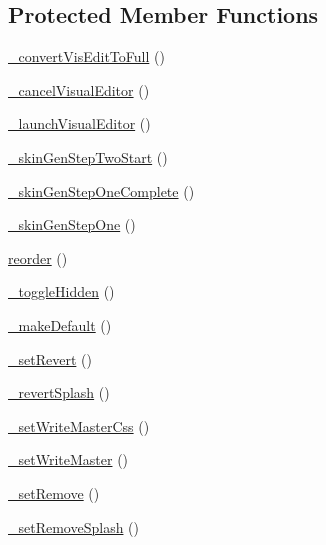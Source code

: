 \subsection*{Protected Member Functions}
\begin{DoxyCompactItemize}
\item 
\hyperlink{classadmin__core__templates__skinsets_afd543a03bf3640aceb2c6581c6a253f4}{\-\_\-convert\-Vis\-Edit\-To\-Full} ()
\item 
\hyperlink{classadmin__core__templates__skinsets_a1fa45ba529feda1ed53e0b3da62ac052}{\-\_\-cancel\-Visual\-Editor} ()
\item 
\hyperlink{classadmin__core__templates__skinsets_a497dec6546df26617a141862ba5a47e8}{\-\_\-launch\-Visual\-Editor} ()
\item 
\hyperlink{classadmin__core__templates__skinsets_a8c2fc2e9df2a3e2ce5bb08481a7ed32d}{\-\_\-skin\-Gen\-Step\-Two\-Start} ()
\item 
\hyperlink{classadmin__core__templates__skinsets_a709366271389c5a9874f5f8fa1bc62f8}{\-\_\-skin\-Gen\-Step\-One\-Complete} ()
\item 
\hyperlink{classadmin__core__templates__skinsets_a04e2c147f267e4264a40166d9d454970}{\-\_\-skin\-Gen\-Step\-One} ()
\item 
\hyperlink{classadmin__core__templates__skinsets_a2a3efef985575940ce6326e11cb85bd8}{reorder} ()
\item 
\hyperlink{classadmin__core__templates__skinsets_aff5a64591b618139f0e6314cb4216c32}{\-\_\-toggle\-Hidden} ()
\item 
\hyperlink{classadmin__core__templates__skinsets_a3c64c3a3ef89713500a9dab891558982}{\-\_\-make\-Default} ()
\item 
\hyperlink{classadmin__core__templates__skinsets_a3454f7fe6ab107b25fcd9744d56de224}{\-\_\-set\-Revert} ()
\item 
\hyperlink{classadmin__core__templates__skinsets_ac7e5c27f82cafcba47c3f02bd0cc0798}{\-\_\-revert\-Splash} ()
\item 
\hyperlink{classadmin__core__templates__skinsets_a5a52545e367b20b92806e7373b20712a}{\-\_\-set\-Write\-Master\-Css} ()
\item 
\hyperlink{classadmin__core__templates__skinsets_a2fd9bbce94d087ba5aedca4c26edcc4f}{\-\_\-set\-Write\-Master} ()
\item 
\hyperlink{classadmin__core__templates__skinsets_a861b0dccdf0475930960c24f910c6a71}{\-\_\-set\-Remove} ()
\item 
\hyperlink{classadmin__core__templates__skinsets_af7b6de80dbe086537347e8b743ec413f}{\-\_\-set\-Remove\-Splash} ()

\end{DoxyCompactItemize}
